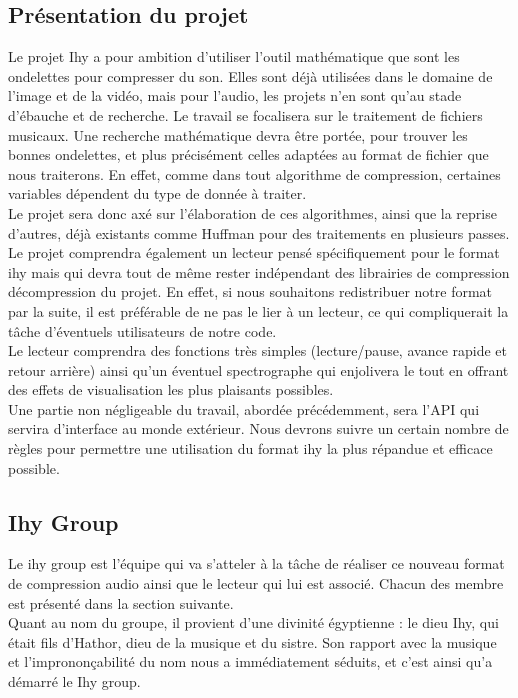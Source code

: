 \documentclass[a4paper,12pt]{article}
\begin{document}
	\subsection{Présentation du projet}
Le projet Ihy  a pour ambition d'utiliser l'outil  mathématique que sont
les ondelettes pour  compresser du son.  Elles sont  déjà utilisées dans
le domaine de  l'image et de la vidéo,  mais  pour l'audio,  les projets
n'en  sont  qu'au  stade  d'ébauche  et  de  recherche.  Le  travail  se
focalisera  sur  le  traitement  de  fichiers  musicaux.  Une  recherche
mathématique devra être portée,  pour trouver les bonnes ondelettes,  et
plus  précisément  celles  adaptées  au   format  de  fichier  que  nous
traiterons.  En  effet,  comme  dans  tout  algorithme  de  compression,
certaines variables dépendent du type de donnée à traiter.\\
Le projet sera donc axé sur l'élaboration de ces algorithmes,  ainsi que
la reprise d'autres,  déjà existants  comme Huffman pour des traitements
en plusieurs passes.\\
Le projet comprendra  également un lecteur pensé  spécifiquement pour le
format ihy mais qui devra tout de même rester indépendant des librairies
de compression  décompression du projet.  En  effet,  si nous souhaitons
redistribuer notre format par la suite,  il  est préférable de ne pas le
lier  à   un  lecteur,   ce  qui  compliquerait   la  tâche  d'éventuels
utilisateurs de notre code.\\
Le lecteur comprendra des fonctions très simples (lecture/pause,  avance
rapide  et  retour  arrière)  ainsi  qu'un  éventuel  spectrographe  qui
enjolivera le tout  en  offrant  des  effets  de  visualisation les plus
plaisants possibles.\\
Une partie non négligeable du travail,  abordée précédemment, sera l'API
qui servira  d'interface  au  monde  extérieur.  Nous  devrons suivre un
certain nombre de règles pour permettre une utilisation du format ihy la
plus répandue et efficace possible.

	\subsection{Ihy Group}
Le ihy  group est l'équipe  qui va s'atteler  à la tâche  de réaliser ce
nouveau format  de compression audio ainsi  que le  lecteur qui  lui est
associé.  Chacun des membre est présenté dans la section suivante.\\
Quant au nom du groupe,  il provient d'une divinité égyptienne : le dieu
Ihy,  qui était  fils d'Hathor,  dieu de  la musique et  du sistre.  Son
rapport  avec   la  musique   et  l'imprononçabilité   du  nom   nous  a
immédiatement séduits, et c'est ainsi qu'a démarré le Ihy group.
\end{document}
